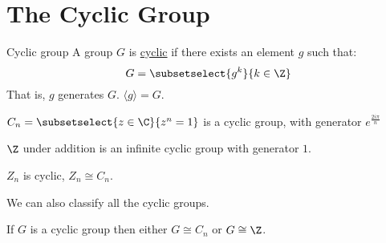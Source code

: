 \documentclass[../Main.tex]{subfiles}
\begin{document}
\section{The Cyclic Group}
\begin{definition}{Cyclic group}
    A group $G$ is \underline{cyclic} if there exists an element $g$ such that:
    \begin{equation*}
        G = \subsetselect{g^k}{k \in \Z}
    \end{equation*}    
    That is, $g$ generates $G$. $\langle g \rangle = G$.
\end{definition}
\begin{examples}{}
    \item $C_n = \subsetselect{z \in \C}{z^n = 1}$ is a cyclic group, with generator $e^{\frac{2i\pi}{n}}$
    \item $\Z$ under addition is an infinite cyclic group with generator $1$.
    \item $Z_n$ is cyclic, $Z_n \cong C_n$.
\end{examples}
We can also classify all the cyclic groups.
\begin{theorem}
    If $G$ is a cyclic group then either $G \cong C_n$ or $G \cong \Z$.
\end{theorem}
\end{document}
